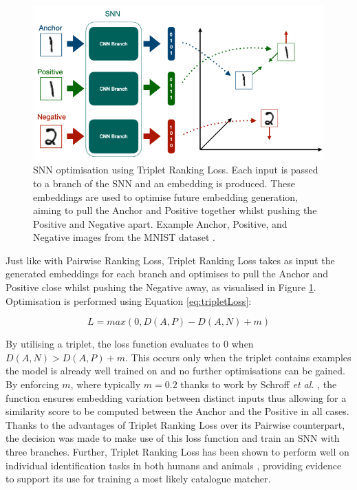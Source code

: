 \begin{figure}
	\begin{center}
		\includegraphics[scale=0.5]{Chapter5/figs/triplet-loss-eg.png}
	\end{center}
	\caption[SNN optimisation using Triplet Ranking Loss.]{SNN optimisation using Triplet Ranking Loss. Each input is passed to a branch of the SNN and an embedding is produced. These embeddings are used to optimise future embedding generation, aiming to pull the Anchor and Positive together whilst pushing the Positive and Negative apart. Example Anchor, Positive, and Negative images from the MNIST dataset \cite{lecun_gradient-based_1998}.}
	\label{fig:triplet-loss-eg}
\end{figure}

Just like with Pairwise Ranking Loss, Triplet Ranking Loss takes as input the generated embeddings for each branch and optimises to pull the Anchor and Positive close whilst pushing the Negative away, as visualised in Figure \ref{fig:triplet-loss-eg}. Optimisation is performed using Equation \ref{eq:tripletLoss}:

\begin{equation}
	\label{eq:tripletLoss}
	L = max(0, D(A,P) - D(A,N) + m)
\end{equation}

By utilising a triplet, the loss function evaluates to 0 when $D(A, N) > D(A, P) + m$. This occurs only when the triplet contains examples the model is already well trained on and no further optimisations can be gained. By enforcing $m$, where typically $m = 0.2$ thanks to work by Schroff \textit{et al.} \cite{schroff_facenet_2015}, the function ensures embedding variation between distinct inputs thus allowing for a similarity score to be computed between the Anchor and the Positive in all cases. Thanks to the advantages of Triplet Ranking Loss over its Pairwise counterpart, the decision was made to make use of this loss function and train an SNN with three branches. Further, Triplet Ranking Loss has been shown to perform well on individual identification tasks in both humans \cite{hermans_defense_2017} and animals \cite{vetrova_hidden_2018}, providing evidence to support its use for training a most likely catalogue matcher.

